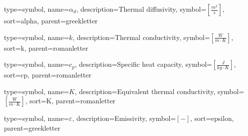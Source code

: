 {
	type=symbol, %
	name={\ensuremath{\alpha_d}}, %
	description={Thermal diffusivity}, %
	symbol={$\left[\frac{m^2}{s}\right]$}, %
	sort=alpha, %
	parent=greekletter %
}

{
	type=symbol, %
	name={\ensuremath{k}}, %
	description={Thermal conductivity}, %
	symbol={$\left[\frac{W}{m\cdot K}\right]$}, %
	sort=k, %
	parent=romanletter %
}

{
	type=symbol, %
	name={\ensuremath{c_p}}, %
	description={Specific heat capacity}, %
	symbol={$\left[\frac{J}{kg\cdot K}\right]$}, %
	sort=cp, %
	parent=romanletter %
}

{
	type=symbol, %
	name={\ensuremath{K}}, %
	description={Equivalent thermal conductivity}, %
	symbol={$\left[\frac{W}{m\cdot K}\right]$}, %
	sort=K, %
	parent=romanletter %
}

{
	type=symbol, %
	name={\ensuremath{\varepsilon}}, %
	description={Emissivity}, %
	symbol={$\left[-\right]$}, %
	sort=epsilon, %
	parent=greekletter %
}

